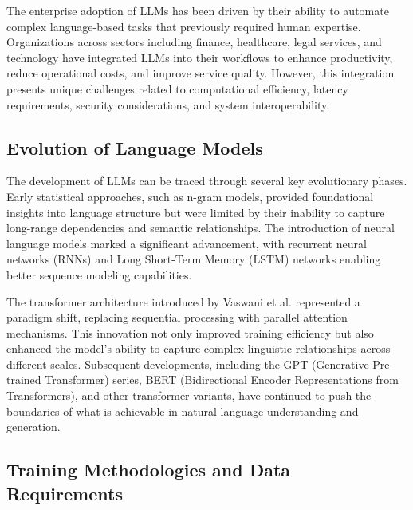 The enterprise adoption of LLMs has been driven by their ability to automate complex language-based tasks that previously required human expertise. Organizations across sectors including finance, healthcare, legal services, and technology have integrated LLMs into their workflows to enhance productivity, reduce operational costs, and improve service quality. However, this integration presents unique challenges related to computational efficiency, latency requirements, security considerations, and system interoperability.


\subsection{Evolution of Language Models}

The development of LLMs can be traced through several key evolutionary phases. Early statistical approaches, such as n-gram models, provided foundational insights into language structure but were limited by their inability to capture long-range dependencies and semantic relationships. The introduction of neural language models marked a significant advancement, with recurrent neural networks (RNNs) and Long Short-Term Memory (LSTM) networks enabling better sequence modeling capabilities.

The transformer architecture introduced by Vaswani et al. represented a paradigm shift, replacing sequential processing with parallel attention mechanisms. This innovation not only improved training efficiency but also enhanced the model's ability to capture complex linguistic relationships across different scales. Subsequent developments, including the GPT (Generative Pre-trained Transformer) series, BERT (Bidirectional Encoder Representations from Transformers), and other transformer variants, have continued to push the boundaries of what is achievable in natural language understanding and generation.

\subsection{Training Methodologies and Data Requirements}

